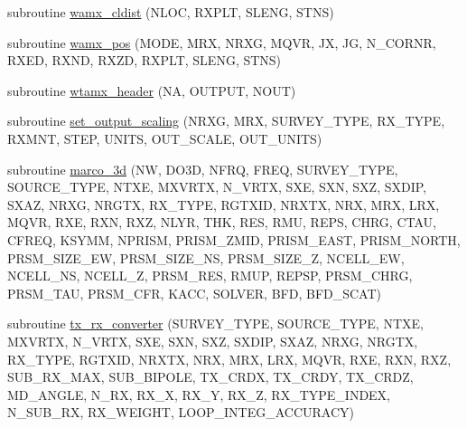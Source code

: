 \begin{DoxyCompactItemize}
\item 
subroutine \hyperlink{Marco_8f90_a8e8bfb89895d93efddca033fd66889bd}{wamx\+\_\+cldist} (N\+L\+OC, R\+X\+P\+LT, S\+L\+E\+NG, S\+T\+NS)
\item 
subroutine \hyperlink{Marco_8f90_a1004d10c3bda42643945bbc256f4824f}{wamx\+\_\+pos} (M\+O\+DE, M\+RX, N\+R\+XG, M\+Q\+VR, JX, JG, N\+\_\+\+C\+O\+R\+NR, R\+X\+ED, R\+X\+ND, R\+X\+ZD, R\+X\+P\+LT, S\+L\+E\+NG, S\+T\+NS)
\item 
subroutine \hyperlink{Marco_8f90_acd10a637c4ea5997d217c8927618ed95}{wtamx\+\_\+header} (NA, O\+U\+T\+P\+UT, N\+O\+UT)
\item 
subroutine \hyperlink{Marco_8f90_aa3ebed79e45d9533c2e2d7c6e1cdc01a}{set\+\_\+output\+\_\+scaling} (N\+R\+XG, M\+RX, S\+U\+R\+V\+E\+Y\+\_\+\+T\+Y\+PE, R\+X\+\_\+\+T\+Y\+PE, R\+X\+M\+NT, S\+T\+EP, U\+N\+I\+TS, O\+U\+T\+\_\+\+S\+C\+A\+LE, O\+U\+T\+\_\+\+U\+N\+I\+TS)
\item 
subroutine \hyperlink{Marco_8f90_a68f6ead64a06017b55ddd63f010a306a}{marco\+\_\+3d} (NW, D\+O3D, N\+F\+RQ, F\+R\+EQ, S\+U\+R\+V\+E\+Y\+\_\+\+T\+Y\+PE, S\+O\+U\+R\+C\+E\+\_\+\+T\+Y\+PE, N\+T\+XE, M\+X\+V\+R\+TX, N\+\_\+\+V\+R\+TX, S\+XE, S\+XN, S\+XZ, S\+X\+D\+IP, S\+X\+AZ, N\+R\+XG, N\+R\+G\+TX, R\+X\+\_\+\+T\+Y\+PE, R\+G\+T\+X\+ID, N\+R\+X\+TX, N\+RX, M\+RX, L\+RX, M\+Q\+VR, R\+XE, R\+XN, R\+XZ, N\+L\+YR, T\+HK, R\+ES, R\+MU, R\+E\+PS, C\+H\+RG, C\+T\+AU, C\+F\+R\+EQ, K\+S\+Y\+MM, N\+P\+R\+I\+SM, P\+R\+I\+S\+M\+\_\+\+Z\+M\+ID, P\+R\+I\+S\+M\+\_\+\+E\+A\+ST, P\+R\+I\+S\+M\+\_\+\+N\+O\+R\+TH, P\+R\+S\+M\+\_\+\+S\+I\+Z\+E\+\_\+\+EW, P\+R\+S\+M\+\_\+\+S\+I\+Z\+E\+\_\+\+NS, P\+R\+S\+M\+\_\+\+S\+I\+Z\+E\+\_\+Z, N\+C\+E\+L\+L\+\_\+\+EW, N\+C\+E\+L\+L\+\_\+\+NS, N\+C\+E\+L\+L\+\_\+Z, P\+R\+S\+M\+\_\+\+R\+ES, R\+M\+UP, R\+E\+P\+SP, P\+R\+S\+M\+\_\+\+C\+H\+RG, P\+R\+S\+M\+\_\+\+T\+AU, P\+R\+S\+M\+\_\+\+C\+FR, K\+A\+CC, S\+O\+L\+V\+ER, B\+FD, B\+F\+D\+\_\+\+S\+C\+AT)
\item 
subroutine \hyperlink{Marco_8f90_a451df71e46f877dff01e7f6310bca641}{tx\+\_\+rx\+\_\+converter} (S\+U\+R\+V\+E\+Y\+\_\+\+T\+Y\+PE, S\+O\+U\+R\+C\+E\+\_\+\+T\+Y\+PE, N\+T\+XE, M\+X\+V\+R\+TX, N\+\_\+\+V\+R\+TX, S\+XE, S\+XN, S\+XZ, S\+X\+D\+IP, S\+X\+AZ, N\+R\+XG, N\+R\+G\+TX, R\+X\+\_\+\+T\+Y\+PE, R\+G\+T\+X\+ID, N\+R\+X\+TX, N\+RX, M\+RX, L\+RX, M\+Q\+VR, R\+XE, R\+XN, R\+XZ, S\+U\+B\+\_\+\+R\+X\+\_\+\+M\+AX, S\+U\+B\+\_\+\+B\+I\+P\+O\+LE, T\+X\+\_\+\+C\+R\+DX, T\+X\+\_\+\+C\+R\+DY, T\+X\+\_\+\+C\+R\+DZ, M\+D\+\_\+\+A\+N\+G\+LE, N\+\_\+\+RX, R\+X\+\_\+X, R\+X\+\_\+Y, R\+X\+\_\+Z, R\+X\+\_\+\+T\+Y\+P\+E\+\_\+\+I\+N\+D\+EX, N\+\_\+\+S\+U\+B\+\_\+\+RX, R\+X\+\_\+\+W\+E\+I\+G\+HT, L\+O\+O\+P\+\_\+\+I\+N\+T\+E\+G\+\_\+\+A\+C\+C\+U\+R\+A\+CY)

\end{DoxyCompactItemize}
